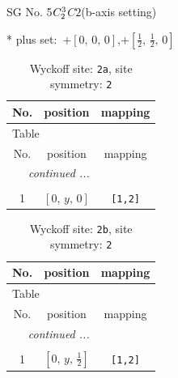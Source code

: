 \documentclass[fleqn,8pt]{jsarticle}
\begin{document}
\setcounter{MaxMatrixCols}{32}

\renewcommand{\tablename}{Table~}
\renewcommand{\figurename}{Figure~}
\begin{center}
\LARGE
SG No. 5\quad$C_{\rm 2}^{3}$\quad$C2$\quad(b-axis setting)\quad[ monoclinic ]
\end{center}
* plus set:\,\,\,$+\left[ 0,\, 0,\, 0 \right]$,\quad $+\left[ \frac{1}{2},\, \frac{1}{2},\, 0 \right]$
\renewcommand{\arraystretch}{1.2}
\begin{longtable}{ccc}
\caption{Wyckoff site: {\tt 2a}, site symmetry: {\tt 2}}
 \\
 \hline \hline
No. & position & mapping \\ \hline \endfirsthead

\multicolumn{2}{l}{\tablename\ \thetable{}} \\
 \hline \hline
No. & position & mapping \\ \hline \endhead

 \hline \hline
\multicolumn{2}{r}{\footnotesize\it continued ...} \\ \endfoot

 \hline \hline
\multicolumn{2}{r}{} \\ \endlastfoot

1 & $\left[ 0,\, y,\, 0 \right]$ & {\tt [1,2]} \\
\end{longtable}
\renewcommand{\arraystretch}{1.2}
\begin{longtable}{ccc}
\caption{Wyckoff site: {\tt 2b}, site symmetry: {\tt 2}}
 \\
 \hline \hline
No. & position & mapping \\ \hline \endfirsthead

\multicolumn{2}{l}{\tablename\ \thetable{}} \\
 \hline \hline
No. & position & mapping \\ \hline \endhead

 \hline \hline
\multicolumn{2}{r}{\footnotesize\it continued ...} \\ \endfoot

 \hline \hline
\multicolumn{2}{r}{} \\ \endlastfoot

1 & $\left[ 0,\, y,\, \frac{1}{2} \right]$ & {\tt [1,2]} \\
\end{longtable}
\renewcommand{\arraystretch}{1.2}
\end{document}
